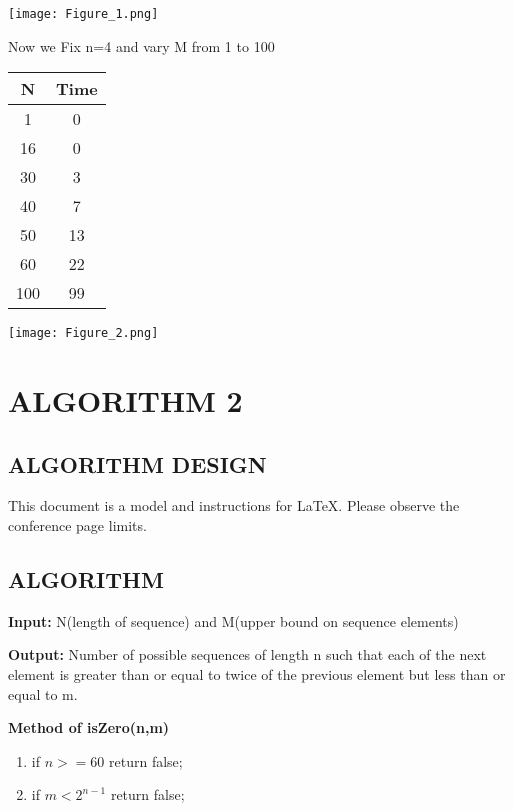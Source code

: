 \documentclass[conference]{IEEEtran}
\begin{document}
\texttt{[image: Figure\_1.png]}

Now we Fix n=4 and vary M from 1 to 100

\begin{center}
   \begin{tabular}{|c|c|}
   \hline
   N & Time \\
   \hline\hline
    1 & 0 \\
    \hline
    16 & 0 \\
    \hline
    30 & 3 \\
    \hline
    40 & 7 \\
    \hline
    50 & 13 \\
    \hline
    60 & 22 \\
    \hline
    100 & 99 \\
    \hline
    \end{tabular} 
\end{center}

\texttt{[image: Figure\_2.png]}

\section{ALGORITHM 2}

\subsection{ALGORITHM DESIGN}

This document is a model and instructions for \LaTeX.
Please observe the conference page limits. 

\subsection{ALGORITHM }

\textbf{Input:} N(length of sequence) and M(upper bound on sequence elements)

\textbf{Output:} Number of possible sequences of length n such that each of the next element is greater than or equal to twice of the previous element but less than or equal to m.

\textbf{Method of isZero(n,m)}

\begin{enumerate}
    \item if $n>=60$ return false;
    \item if $m<2^{n-1}$ return false;
\end{enumerate}
\end{document}

